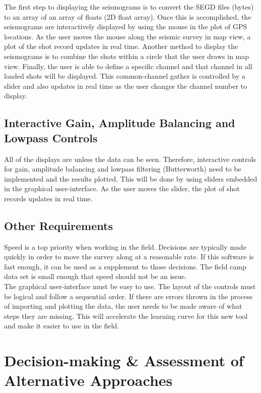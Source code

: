 \documentclass[12pt]{article}
\begin{document}
The first step to displaying the seismograms is to convert the SEGD files (bytes) to an array of an array of floats (2D float array). Once this is accomplished, the seismograms are interactively displayed by using the mouse in the plot of GPS locations. As the user moves the mouse along the seismic survey in map view, a plot of the shot record updates in real time. Another method to display the seismograms is to combine the shots within a circle that the user draws in map view. Finally, the user is able to define a specific channel and that channel in all loaded shots will be displayed. This common-channel gather is controlled by a slider and also updates in real time as the user changes the channel number to display. \\

\subsection{Interactive Gain, Amplitude Balancing and Lowpass Controls}

All of the displays are unless the data can be seen. Therefore, interactive controls for gain, amplitude balancing and lowpass filtering (Butterworth) need to be implemented and the results plotted. This will be done by using sliders embedded in the graphical user-interface. As the user moves the slider, the plot of shot records updates in real time.

\subsection{Other Requirements}

Speed is a top priority when working in the field. Decisions are typically made quickly in order to move the survey along at a reasonable rate. If this software is fast enough, it can be used as a supplement to those decisions. The field camp data set is small enough that speed should not be an issue. \\

The graphical user-interface must be easy to use. The layout of the controls must be logical and follow a sequential order.  If there are errors thrown in the process of importing and plotting the data, the user needs to be made aware of what steps they are missing. This will accelerate the learning curve for this new tool and make it easier to use in the field.

\section{Decision-making \& Assessment of Alternative Approaches}
\end{document}
